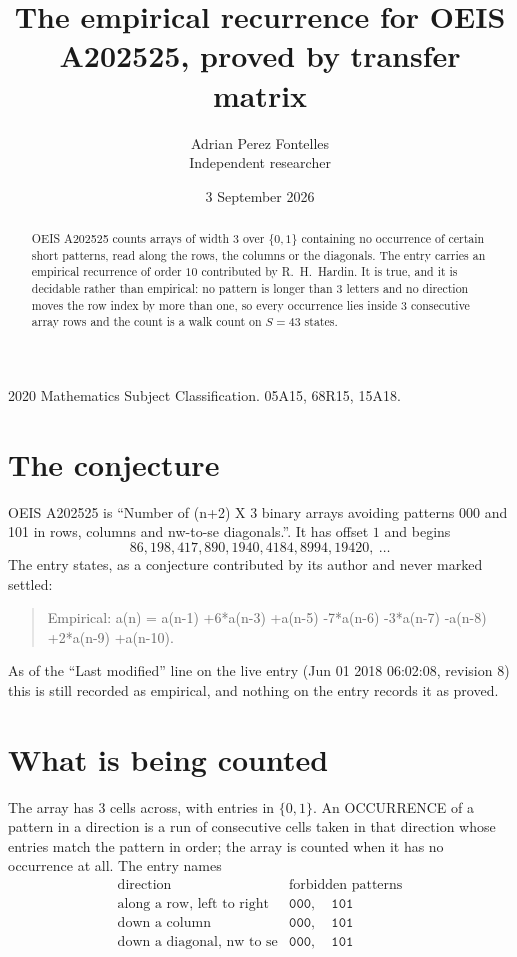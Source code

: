 \documentclass[11pt,a4paper]{article}
\title{The empirical recurrence for OEIS A202525, proved by transfer matrix}
\author{Adrian Perez Fontelles\\ \small Independent researcher}
\date{3 September 2026}
\theoremstyle{plain}
\theoremstyle{definition}
\begin{document}
\maketitle

\begin{abstract}
OEIS A202525 counts arrays of width $3$ over $\{0,1\}$ containing no occurrence of certain short
patterns, read along the rows, the columns or the diagonals. The entry carries an empirical
recurrence of order $10$ contributed by R.~H.~Hardin. It is true, and it is decidable
rather than empirical: no pattern is longer than $3$ letters and no direction moves the row
index by more than one, so every occurrence lies inside $3$ consecutive array rows and the
count is a walk count on $S=43$ states.
\end{abstract}

\noindent\small 2020 Mathematics Subject Classification. 05A15, 68R15, 15A18.\normalsize

\section{The conjecture}

OEIS A202525 is ``Number of (n+2) X 3 binary arrays avoiding patterns 000 and 101 in rows, columns and nw-to-se diagonals.''. It has offset $1$ and begins
\[
86, 198, 417, 890, 1940, 4184, 8994, 19420,\ \dots
\]
The entry states, as a conjecture contributed by its author and never marked settled:
\begin{quote}
Empirical: a(n) = a(n-1) +6*a(n-3) +a(n-5) -7*a(n-6) -3*a(n-7) -a(n-8) +2*a(n-9) +a(n-10).
\end{quote}
As of the ``Last modified'' line on the live entry (Jun 01 2018 06:02:08, revision 8) this is still
recorded as empirical, and nothing on the entry records it as proved.

\section{What is being counted}

The array has $3$ cells across, with entries in $\{0,1\}$. An OCCURRENCE of a pattern in a
direction is a run of consecutive cells taken in that direction whose entries match the pattern
in order; the array is counted when it has no occurrence at all. The entry names
\[
\begin{array}{ll}
\text{direction} & \text{forbidden patterns} \\[2pt]
\text{along a row, left to right} & \mathtt{000},\quad \mathtt{101} \\
\text{down a column} & \mathtt{000},\quad \mathtt{101} \\
\text{down a diagonal, nw to se} & \mathtt{000},\quad \mathtt{101} \\
\end{array}
\]
\end{document}
